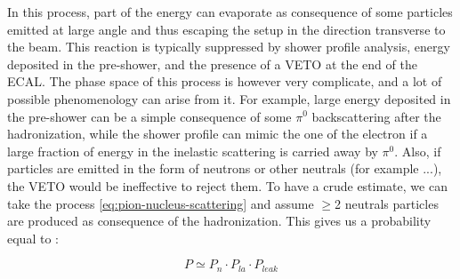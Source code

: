 In this process, part of the energy can evaporate as consequence of some particles emitted at large angle and thus escaping the setup in the direction transverse to the beam. This reaction is typically suppressed by shower profile analysis, energy deposited in the pre-shower, and the presence of a VETO at the end of the ECAL. The phase space of this process is however very complicate, and a lot of possible phenomenology can arise from it. For example, large energy deposited in the pre-shower can be a simple consequence of some $\pi^0$ backscattering after the hadronization, while the shower profile can mimic the one of the electron if a large fraction of energy in the inelastic scattering is carried away by $\pi^0$. Also, if particles are emitted in the form of neutrons or other neutrals (for example ...), the VETO would be ineffective to reject them. To have a crude estimate, we can take the process \ref{eq:pion-nucleus-scattering} and assume $\geq$2 neutrals particles are produced as consequence of the hadronization. This gives us a probability equal to \cite{gkkk1}:

\begin{equation}
  \label{eq:transverse-leak-estimate}
  P \simeq P_n \cdot P_{la} \cdot P_{leak}
\end{equation}

